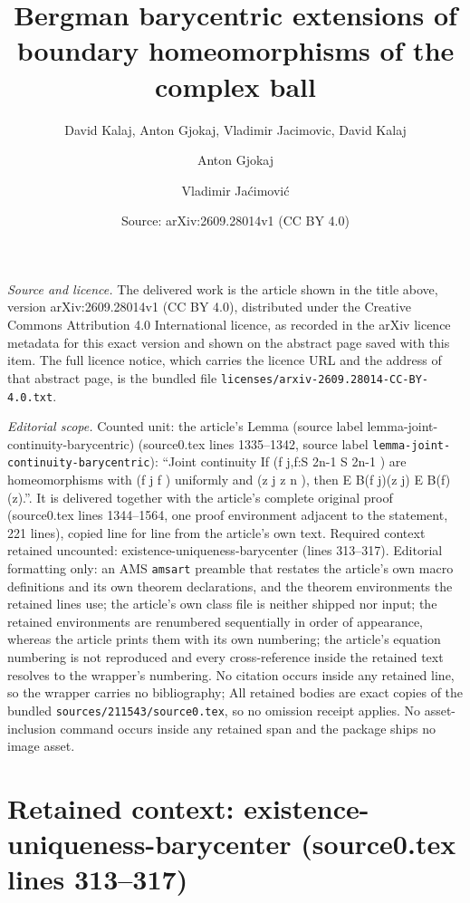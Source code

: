\documentclass[10pt,a4paper]{amsart}
\title[Bergman barycentric extensions of boundary homeomorphisms of the complex ball]{Bergman barycentric extensions of boundary homeomorphisms of the complex ball}
\author{David Kalaj, Anton Gjokaj, Vladimir Jacimovic, David Kalaj \and Anton Gjokaj \and Vladimir Ja\'cimovi\'c}
\date{Source: arXiv:2609.28014v1 (CC BY 4.0)}
\theoremstyle{plain}
\theoremstyle{definition}
\theoremstyle{remark}
\theoremstyle{definition}
\begin{document}
\maketitle

\noindent\emph{Source and licence.} The delivered work is the article shown in the title above, version arXiv:2609.28014v1 (CC BY 4.0), distributed under the Creative Commons Attribution 4.0 International licence, as recorded in the arXiv licence metadata for this exact version and shown on the abstract page saved with this item. The full licence notice, which carries the licence URL and the address of that abstract page, is the bundled file \texttt{licenses/arxiv-2609.28014-CC-BY-4.0.txt}.
\par\smallskip

\noindent\textit{Editorial scope.} Counted unit: the article's Lemma (source label lemma-joint-continuity-barycentric) (source0.tex lines 1335--1342, source label \texttt{lemma-joint-continuity-barycentric}): ``Joint continuity If (f j,f:S 2n-1 S 2n-1 ) are homeomorphisms with (f j f ) uniformly and (z j z n ), then E B(f j)(z j) E B(f)(z).''. It is delivered together with the article's complete original proof (source0.tex lines 1344--1564, one proof environment adjacent to the statement, 221 lines), copied line for line from the article's own text. Required context retained uncounted: existence-uniqueness-barycenter (lines 313--317). Editorial formatting only: an AMS \texttt{amsart} preamble that restates the article's own macro definitions and its own theorem declarations, and the theorem environments the retained lines use; the article's own class file is neither shipped nor input; the retained environments are renumbered sequentially in order of appearance, whereas the article prints them with its own numbering; the article's equation numbering is not reproduced and every cross-reference inside the retained text resolves to the wrapper's numbering. No citation occurs inside any retained line, so the wrapper carries no bibliography; All retained bodies are exact copies of the bundled \texttt{sources/211543/source0.tex}, so no omission receipt applies. No asset-inclusion command occurs inside any retained span and the package ships no image asset.


\section*{Retained context: existence-uniqueness-barycenter (source0.tex lines 313--317)}
\end{document}
